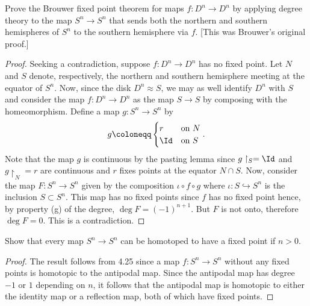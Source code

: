 \begin{problem}[Hatcher {\S}2.2, Ex.\@ 1]
Prove the Brouwer fixed point theorem for maps $f\colon D^n\to D^n$ by
applying degree theory to the map $S^n\to S^n$ that sends both the northern
and southern hemispheres of $S^n$ to the southern hemisphere via $f$. [This
was Brouwer’s original proof.]
\end{problem}
\begin{proof}
Seeking a contradiction, suppose $f\colon D^n\to D^n$ has no fixed
point. Let $N$ and $S$ denote, respectively, the northern and southern
hemisphere meeting at the equator of $S^n$. Now, since the disk $D^n\approx
S$, we may as well identify $D^n$ with $S$ and consider the map $f\colon
D^n\to D^n$ as the map $S\to S$ by composing with the homeomorphism. Define
a map $g\colon S^n\to S^n$ by
\begin{equation}
\label{eq:half-antipodal-map}
g
\coloneqq
\begin{cases}
r&\text{on $N$}\\
\Id&\text{on $S$}
\end{cases}.
\end{equation}
Note that the map $g$ is continuous by the pasting lemma since
$g\restriction_S=\Id$ and $g\restriction_N=r$ are continuous and $r$ fixes
points at the equator $N\cap S$. Now, consider the map $F\colon S^n\to S^n$
given by the composition $\iota\circ f\circ g$ where $\iota\colon
S\hookrightarrow S^n$ is the inclusion $S\subset S^n$. This map has no
fixed points since $f$ has no fixed point hence, by property (g) of the
degree, $\deg F=(-1)^{n+1}$. But $F$ is not onto, therefore $\deg
F=0$. This is a contradiction.
\end{proof}
\newpage

\begin{problem}[Hatcher {\S}2.2, Ex.\@ 6]
Show that every map $S^n\to S^n$ can be homotoped to have a fixed point
if $n>0$.
\end{problem}
\begin{proof}
The result follows from 4.25 since a map $f\colon S^n\to S^n$ without any
fixed points is homotopic to the antipodal map. Since the antipodal map has
degree $-1$ or $1$ depending on $n$, it follows that the antipodal map is
homotopic to either the identity map or a reflection map, both of which
have fixed points.
\end{proof}
\newpage

